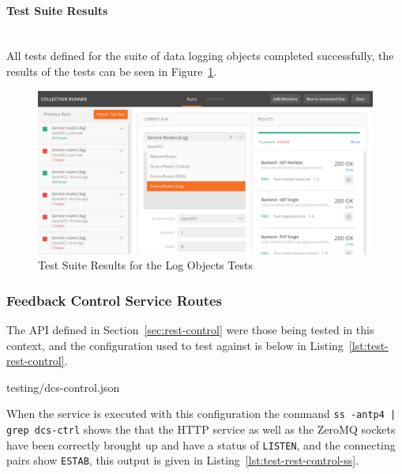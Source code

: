       \newpage
      \paragraph{Test Suite Results}\mbox{}\\

        All tests defined for the suite of data logging objects completed
        successfully, the results of the tests can be seen in
        Figure~\ref{fig:test-postman-log-suite}.

        \begin{figure}[H]
          \includegraphics[width=\textwidth]{figures/testing/postman-log-suite-results}
          \caption{Test Suite Results for the Log Objects Tests}
          \label{fig:test-postman-log-suite}
        \end{figure}

    \subsubsection{Feedback Control Service Routes}\label{sec:test-rest-control}

      The API defined in Section~\ref{sec:rest-control} were those being tested
      in this context, and the configuration used to test against is below in
      Listing~\ref{lst:test-rest-control}.

      
                      {testing/dcs-control.json}

      When the service is executed with this configuration the command
      \texttt{ss -antp4 | grep dcs-ctrl} shows the that the HTTP service as
      well as the ZeroMQ sockets have been correctly brought up and have a
      status of \texttt{LISTEN}, and the connecting pairs show \texttt{ESTAB},
      this output is given in Listing~\ref{lst:test-rest-control-ss}.

